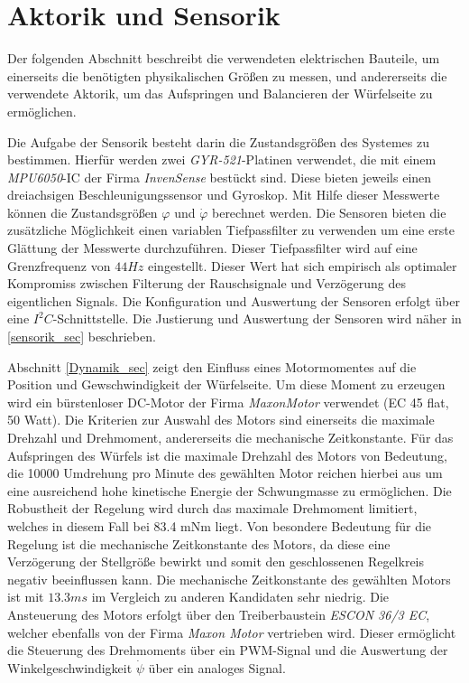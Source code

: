 \section{Aktorik und Sensorik}
Der folgenden Abschnitt beschreibt die verwendeten elektrischen Bauteile, um einerseits die benötigten physikalischen Größen zu messen, und andererseits die verwendete Aktorik, um das Aufspringen und Balancieren der Würfelseite zu ermöglichen.
\newline 

Die Aufgabe der Sensorik besteht darin die Zustandsgrößen des Systemes zu bestimmen. Hierfür werden zwei \textit{GYR-521}-Platinen verwendet, die mit einem \textit{MPU6050}-IC der Firma \textit{InvenSense} bestückt sind. Diese bieten jeweils einen dreiachsigen Beschleunigungssensor und Gyroskop. Mit Hilfe dieser Messwerte können die Zustandsgrößen $\varphi$ und $\dot{\varphi}$ berechnet werden. Die Sensoren bieten die zusätzliche Möglichkeit einen variablen Tiefpassfilter zu verwenden um eine erste Glättung der Messwerte durchzuführen. Dieser Tiefpassfilter wird auf eine Grenzfrequenz von $44Hz$ eingestellt. Dieser Wert hat sich empirisch als optimaler Kompromiss zwischen Filterung der Rauschsignale und Verzögerung des eigentlichen Signals. Die Konfiguration und Auswertung der Sensoren erfolgt über eine $I^2C$-Schnittstelle. Die Justierung und Auswertung der Sensoren wird näher in \ref{sensorik_sec} beschrieben.
\newline

Abschnitt \ref{Dynamik_sec} zeigt den Einfluss eines Motormomentes auf die Position und Gewschwindigkeit der Würfelseite. Um diese Moment zu erzeugen wird ein bürstenloser DC-Motor der Firma \textit{MaxonMotor} verwendet (EC 45 flat, 50 Watt). Die Kriterien zur Auswahl des Motors sind einerseits die maximale Drehzahl und Drehmoment, andererseits die mechanische Zeitkonstante. Für das Aufspringen des Würfels ist die maximale Drehzahl des Motors von Bedeutung, die 10000 Umdrehung pro Minute des gewählten Motor reichen hierbei aus um eine ausreichend hohe kinetische Energie der Schwungmasse zu ermöglichen. Die Robustheit der Regelung wird durch das maximale Drehmoment limitiert, welches in diesem Fall bei 83.4 mNm liegt. Von besondere Bedeutung für die Regelung ist die mechanische Zeitkonstante des Motors, da diese eine Verzögerung der Stellgröße bewirkt und somit den geschlossenen Regelkreis negativ beeinflussen kann. Die mechanische Zeitkonstante des gewählten Motors ist mit $13.3ms$ im Vergleich zu anderen Kandidaten sehr niedrig. Die Ansteuerung des Motors erfolgt über den Treiberbaustein \textit{ESCON 36/3 EC}, welcher ebenfalls von der Firma \textit{Maxon Motor} vertrieben wird. Dieser ermöglicht die Steuerung des Drehmoments über ein PWM-Signal und die Auswertung der Winkelgeschwindigkeit $\dot{\psi}$ über ein analoges Signal.
\newline


